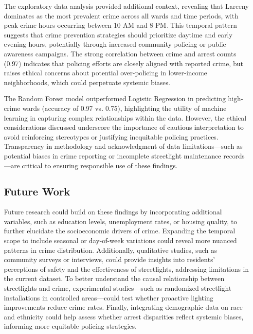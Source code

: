 \documentclass{report}
\begin{document}
\par The exploratory data analysis provided additional context, revealing that Larceny dominates as the most prevalent crime across all wards and time periods, with peak crime hours occurring between 10 AM and 8 PM. This temporal pattern suggests that crime prevention strategies should prioritize daytime and early evening hours, potentially through increased community policing or public awareness campaigns. The strong correlation between crime and arrest counts (0.97) indicates that policing efforts are closely aligned with reported crime, but raises ethical concerns about potential over-policing in lower-income neighborhoods, which could perpetuate systemic biases.

\par The Random Forest model outperformed Logistic Regression in predicting high-crime wards (accuracy of 0.97 vs. 0.75), highlighting the utility of machine learning in capturing complex relationships within the data. However, the ethical considerations discussed underscore the importance of cautious interpretation to avoid reinforcing stereotypes or justifying inequitable policing practices. Transparency in methodology and acknowledgment of data limitations—such as potential biases in crime reporting or incomplete streetlight maintenance records—are critical to ensuring responsible use of these findings.

\subsection{Future Work}
\par Future research could build on these findings by incorporating additional variables, such as education levels, unemployment rates, or housing quality, to further elucidate the socioeconomic drivers of crime. Expanding the temporal scope to include seasonal or day-of-week variations could reveal more nuanced patterns in crime distribution. Additionally, qualitative studies, such as community surveys or interviews, could provide insights into residents' perceptions of safety and the effectiveness of streetlights, addressing limitations in the current dataset. To better understand the causal relationship between streetlights and crime, experimental studies—such as randomized streetlight installations in controlled areas—could test whether proactive lighting improvements reduce crime rates. Finally, integrating demographic data on race and ethnicity could help assess whether arrest disparities reflect systemic biases, informing more equitable policing strategies.
\end{document}
